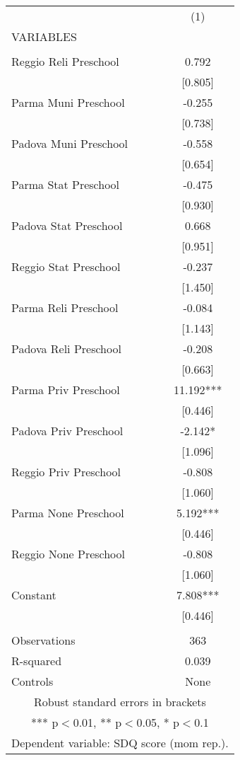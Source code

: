 \begin{tabular}{lc} \hline
 & (1) \\
VARIABLES &  \\ \hline
 &  \\
Reggio Reli Preschool & 0.792 \\
 & [0.805] \\
Parma Muni Preschool & -0.255 \\
 & [0.738] \\
Padova Muni Preschool & -0.558 \\
 & [0.654] \\
Parma Stat Preschool & -0.475 \\
 & [0.930] \\
Padova Stat Preschool & 0.668 \\
 & [0.951] \\
Reggio Stat Preschool & -0.237 \\
 & [1.450] \\
Parma Reli Preschool & -0.084 \\
 & [1.143] \\
Padova Reli Preschool & -0.208 \\
 & [0.663] \\
Parma Priv Preschool & 11.192*** \\
 & [0.446] \\
Padova Priv Preschool & -2.142* \\
 & [1.096] \\
Reggio Priv Preschool & -0.808 \\
 & [1.060] \\
Parma None Preschool & 5.192*** \\
 & [0.446] \\
Reggio None Preschool & -0.808 \\
 & [1.060] \\
Constant & 7.808*** \\
 & [0.446] \\
 &  \\
Observations & 363 \\
R-squared & 0.039 \\
 Controls & None \\ \hline
\multicolumn{2}{c}{ Robust standard errors in brackets} \\
\multicolumn{2}{c}{ *** p$<$0.01, ** p$<$0.05, * p$<$0.1} \\
\multicolumn{2}{c}{ Dependent variable: SDQ score (mom rep.).} \\
\end{tabular}
